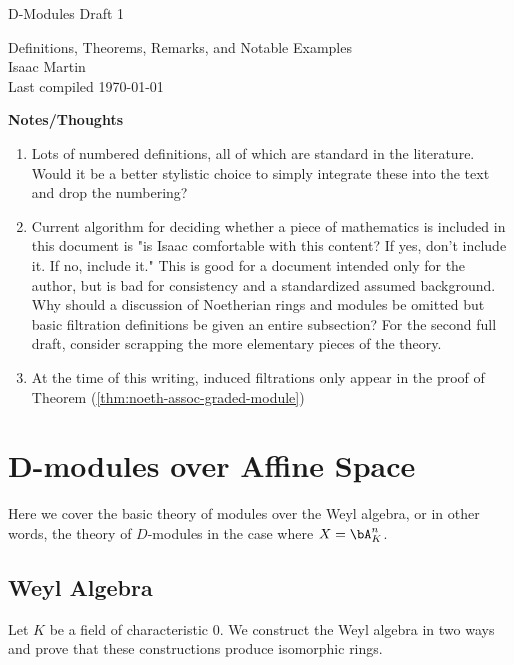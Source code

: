 


\begin{center}
	\Large
	\begin{LARGE}
		D-Modules Draft 1 \\
	\end{LARGE}
	Definitions, Theorems, Remarks, and Notable Examples \\
	Isaac Martin \\
    Last compiled \today
\end{center}
\normalsize
\vspace{-2mm}
\hru

\tableofcontents
\newpage
\noindent \textbf{Notes/Thoughts}
\begin{enumerate}
	\item Lots of numbered definitions, all of which are standard in the literature. Would it be a better stylistic choice to simply integrate these into the text and drop the numbering?
	\item Current algorithm for deciding whether a piece of mathematics is included in this document is "is Isaac comfortable with this content? If yes, don't include it. If no, include it." This is good for a document intended only for the author, but is bad for consistency and a standardized assumed background. Why should a discussion of Noetherian rings and modules be omitted but basic filtration definitions be given an entire subsection? For the second full draft, consider scrapping the more elementary pieces of the theory.
	\item At the time of this writing, induced filtrations only appear in the proof of Theorem (\ref{thm:noeth-assoc-graded-module})
\end{enumerate}
\newpage
\section{D-modules over Affine Space}
Here we cover the basic theory of modules over the Weyl algebra, or in other words, the theory of $D$-modules in the case where $X = \bA^n_K$.

\subsection{Weyl Algebra}
Let $K$ be a field of characteristic $0$. We construct the Weyl algebra in two ways and prove that these constructions produce isomorphic rings.


